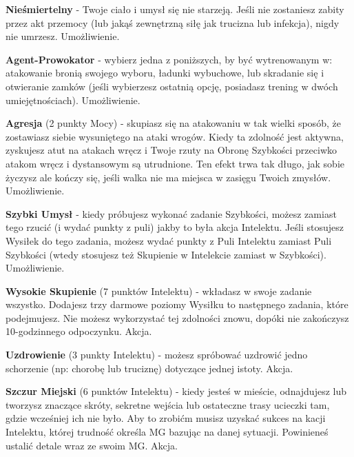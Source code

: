 \textbf{Nieśmiertelny}\label{sec:Nieśmiertelny} - Twoje ciało i umysł się nie starzeją. Jeśli nie zostaniesz zabity przez akt przemocy (lub jakąś zewnętrzną siłę jak trucizna lub infekcja), nigdy nie umrzesz. Umożliwienie.  

\textbf{Agent-Prowokator}\label{sec:Agent-Prowokator} - wybierz jedna z poniższych, by być wytrenowanym w: atakowanie bronią swojego wyboru, ładunki wybuchowe, lub skradanie się i otwieranie zamków (jeśli wybierzesz ostatnią opcję, posiadasz trening w dwóch umiejętnościach). Umożliwienie.

\textbf{Agresja}\label{sec:Agresja} (2 punkty Mocy) - skupiasz się na atakowaniu w tak wielki sposób, że zostawiasz siebie wysuniętego na ataki wrogów. Kiedy ta zdolność jest aktywna, zyskujesz atut na atakach wręcz i Twoje rzuty na Obronę Szybkości przeciwko atakom wręcz i dystansowym są utrudnione. Ten efekt trwa tak długo, jak sobie życzysz ale kończy się, jeśli walka nie ma miejsca w zasięgu Twoich zmysłów. Umożliwienie.

\textbf{Szybki Umysł}\label{sec:Szybki Umysł} - kiedy próbujesz wykonać zadanie Szybkości, możesz zamiast tego rzucić (i wydać punkty z puli) jakby to była akcja Intelektu. Jeśli stosujesz Wysiłek do tego zadania, możesz wydać punkty z Puli Intelektu zamiast Puli Szybkości (wtedy stosujesz też Skupienie w Intelekcie zamiast w Szybkości). Umożliwienie. 

\textbf{Wysokie Skupienie}\label{sec:Wysokie Skupienie} (7 punktów Intelektu) - wkładasz w swoje zadanie wszystko. Dodajesz trzy darmowe poziomy Wysiłku to następnego zadania, które podejmujesz. Nie możesz wykorzystać tej zdolności znowu, dopóki nie zakończysz 10-godzinnego odpoczynku. Akcja.

\textbf{Uzdrowienie}\label{sec:Uzdrowienie} (3 punkty Intelektu) - możesz spróbować uzdrowić jedno schorzenie (np: chorobę lub truciznę) dotyczące jednej istoty. Akcja.

\textbf{Szczur Miejski}\label{sec:Szczur Miejski} (6 punktów Intelektu) - kiedy jesteś w mieście, odnajdujesz lub tworzysz znaczące skróty, sekretne wejścia lub ostateczne trasy ucieczki tam, gdzie wcześniej ich nie było. Aby to zrobićm musisz uzyskać sukces na kacji Intelektu, której trudność określa MG bazując na danej sytuacji. Powinieneś ustalić detale wraz ze swoim MG. Akcja.

